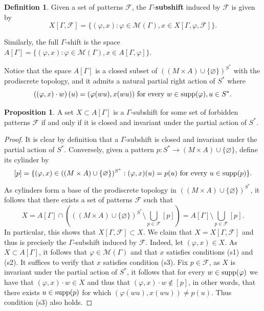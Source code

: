 \documentclass{article}
\theoremstyle{definition}
\newtheorem{prop}[theorem]{Proposition}
\newtheorem{defn}[theorem]{Definition} %
\theoremstyle{definition}
\newcommand{\M}{\mathcal{M}}
\newcommand{\supp}{\textnormal{supp}}
\newcommand{\define}[1]{\textbf{#1}}
\begin{document}
\begin{defn}
\label{def:subshift}
    Given a set of patterns $\mathcal{F}$, the $\Gamma$-\define{subshift} induced by $\mathcal{F}$  is given by \[ X[{\Gamma},\mathcal{F}] = \{ (\varphi,x) : \varphi \in \M(\Gamma), x \in  X[\Gamma, \varphi, \mathcal{F}]\}.    \]

    Similarly, the full $\Gamma$-shift is the space $A[\Gamma] = \{  (\varphi,x) : \varphi \in \M(\Gamma), x \in  A[\Gamma,\varphi]\}$.
\end{defn}

Notice that the space $A[\Gamma]$ is a closed subset of $((M\times A)\cup \{\varnothing\})^{S^*}$ with the prodiscrete topology, and it admits a natural partial right action of $S^*$ where \[ \left((\varphi,x)\cdot w\right)(u) = (\varphi(wu),x(wu))  \mbox{ for every } w \in \supp(\varphi), u \in S^*. \]

\begin{prop}
    A set $X\subset A[\Gamma]$ is a $\Gamma$-subshift for some set of forbidden patterns $\mathcal{F}$ if and only if it is closed and invariant under the partial action of $S^*$.
\end{prop}

\begin{proof}
    It is clear by definition that a $\Gamma$-subshift is closed and invariant under the partial action of $S^*$. Conversely, given a pattern $p \colon S^* \to (M\times A) \cup \{\varnothing\}$, define its cylinder by \[ [p] = \{ (\varphi,x) \in ((M\times A)\cup \{\varnothing\})^{S^*} : (\varphi,x)(u) = p(u) \mbox{ for every } u \in \supp(p) \}.\]
    As cylinders form a base of the prodiscrete topology in $((M\times A)\cup \{\varnothing\})^{S^*}$, it follows that there exists a set of patterns $\mathcal{F}$ such that \[  X = A[\Gamma] \cap \left(  ((M\times A)\cup \{\varnothing\})^{S^*}  \setminus  \bigcup_{p \in \mathcal{F}}[p]\right) = A[\Gamma] \setminus \bigcup_{p \in \mathcal{F}}[p]. \]
    In particular, this shows that $X[\Gamma,\mathcal{F}]\subset X$. We claim that $X = X[\Gamma,\mathcal{F}]$ and thus is precisely the $\Gamma$-subshift induced by $\mathcal{F}$. Indeed, let $(\varphi,x) \in X$. As $X\subset A[\Gamma]$, it follows that $\varphi \in \M(\Gamma)$ and that $x$ satisfies conditions (s1) and (s2). It suffices to verify that $x$ satisfies condition (s3). Fix $p \in \mathcal{F}$, as $X$ is invariant under the partial action of $S^*$, it follows that for every $w \in \supp(\varphi)$ we have that $(\varphi,x)\cdot w \in X$ and thus that $(\varphi,x)\cdot w \notin [p]$, in other words, that there exists $u \in \supp(p)$ for which $(\varphi(wu),x(wu))\neq p(u)$. Thus condition (s3) also holds.
\end{proof}
\end{document}
